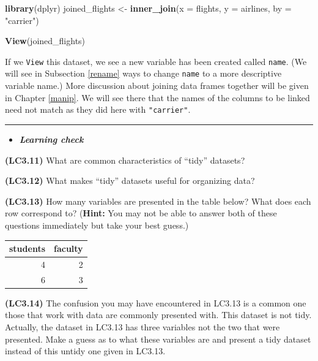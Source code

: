 \documentclass[]{tufte-book}
\newenvironment{Shaded}{\begin{snugshade}}{\end{snugshade}}
\newcommand{\KeywordTok}[1]{\textcolor[rgb]{0.13,0.29,0.53}{\textbf{{#1}}}}
\newcommand{\DataTypeTok}[1]{\textcolor[rgb]{0.13,0.29,0.53}{{#1}}}
\newcommand{\StringTok}[1]{\textcolor[rgb]{0.31,0.60,0.02}{{#1}}}
\newcommand{\NormalTok}[1]{{#1}}
\let\oldrule=\rule
\renewcommand{\rule}[1]{\oldrule{\linewidth}}
\newenvironment{rmdblock}[1]
  {\begin{shaded*}
  \begin{itemize}
  \renewcommand{\labelitemi}{
    \raisebox{-.7\height}[0pt][0pt]{
    }
  }
  \item
  }
  {
  \end{itemize}
  \end{shaded*}
  }
\newenvironment{learncheck}
  {\begin{rmdblock}{warning}}
  {\end{rmdblock}}
\begin{document}
\begin{Shaded}
\begin{Highlighting}[]
\KeywordTok{library}\NormalTok{(dplyr)}
\NormalTok{joined_flights <-}\StringTok{ }\KeywordTok{inner_join}\NormalTok{(}\DataTypeTok{x =} \NormalTok{flights, }\DataTypeTok{y =} \NormalTok{airlines, }\DataTypeTok{by =} \StringTok{"carrier"}\NormalTok{)}
\end{Highlighting}
\end{Shaded}

\begin{Shaded}
\begin{Highlighting}[]
\KeywordTok{View}\NormalTok{(joined_flights)}
\end{Highlighting}
\end{Shaded}

If we \texttt{View} this dataset, we see a new variable has been created
called \texttt{name}. (We will see in Subsection \ref{rename} ways to
change \texttt{name} to a more descriptive variable name.) More
discussion about joining data frames together will be given in Chapter
\ref{manip}. We will see there that the names of the columns to be
linked need not match as they did here with \texttt{"carrier"}.

\begin{center}\rule{0.5\linewidth}{\linethickness}\end{center}

\begin{learncheck}
\textbf{\emph{Learning check}}
\end{learncheck}

\textbf{(LC3.11)} What are common characteristics of ``tidy'' datasets?

\textbf{(LC3.12)} What makes ``tidy'' datasets useful for organizing
data?

\textbf{(LC3.13)} How many variables are presented in the table below?
What does each row correspond to? (\textbf{Hint:} You may not be able to
answer both of these questions immediately but take your best guess.)

\begin{tabular}{r|r}
\hline
students & faculty\\
\hline
4 & 2\\
\hline
6 & 3\\
\hline
\end{tabular}

\textbf{(LC3.14)} The confusion you may have encountered in LC3.13 is a
common one those that work with data are commonly presented with. This
dataset is not tidy. Actually, the dataset in LC3.13 has three variables
not the two that were presented. Make a guess as to what these variables
are and present a tidy dataset instead of this untidy one given in
LC3.13.
\end{document}
